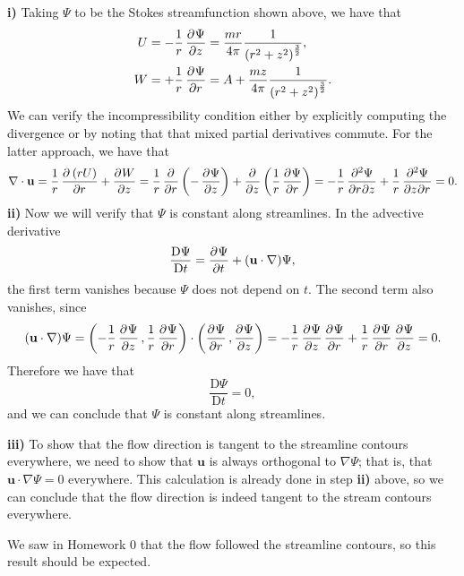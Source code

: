 \documentclass{article}
\def\*#1{\mathbf{#1}}
\newcommand{\dadvd}[2]{\dfrac{\text{D} #1}{\text{D} #2}} %
\begin{document}
\textbf{i)} Taking $\Psi$ to be the Stokes streamfunction shown above,
we have that
%
\begin{align*}
    U &= - \frac{1}{r} \dpd{\Psi}{z}
        = \frac{m r}{4 \pi} \frac{1}{\del{r^2 + z^2}^{\frac{3}{2}}}
        , \\
    W &= + \frac{1}{r} \dpd{\Psi}{r}
        = A + \frac{m z}{4 \pi} \frac{1}{\del{r^2 + z^2}^{\frac{3}{2}}}
        .
\end{align*}
%
We can verify the incompressibility condition either by explicitly
computing the divergence or by noting that that mixed partial
derivatives commute. For the latter approach, we have that
%
\begin{equation*}
    \nabla \cdot \*u
        = \frac{1}{r} \dpd{\del{r U}}{r} + \dpd{W}{z}
        = \frac{1}{r} \dpd{}{r} \del{- \dpd{\Psi}{z}}
            + \dpd{}{z} \del{\frac{1}{r} \dpd{\Psi}{r}}
        = - \frac{1}{r} \dmd{\Psi}{2}{r}{}{z}{}
            + \frac{1}{r} \dmd{\Psi}{2}{z}{}{r}{}
        = 0
        .
\end{equation*}
%
\textbf{ii)} Now we will verify that $\Psi$ is constant along
streamlines. In the advective derivative
%
\begin{equation*}
    \dadvd{\Psi}{t} = \dpd{\Psi}{t} + (\*u \cdot \nabla) \Psi
    ,
\end{equation*}
%
the first term vanishes because $\Psi$ does not depend on $t$. The
second term also vanishes, since
%
\begin{equation*}
    (\*u \cdot \nabla) \Psi
        = \del{- \frac{1}{r} \dpd{\Psi}{z}, \frac{1}{r} \dpd{\Psi}{r}}
            \cdot \del{\dpd{\Psi}{r}, \dpd{\Psi}{z}}
        = - \frac{1}{r} \dpd{\Psi}{z} \dpd{\Psi}{r}
            +\frac{1}{r} \dpd{\Psi}{r} \dpd{\Psi}{z}
        = 0
        .
\end{equation*}
%
Therefore we have that
%
\begin{equation*}
    \dadvd{\Psi}{t} = 0
    ,
\end{equation*}
%
and we can conclude that $\Psi$ is constant along streamlines.

\textbf{iii)} To show that the flow direction is tangent to the
streamline contours everywhere, we need to show that $\*u$ is always
orthogonal to $\nabla \Psi$; that is, that $\*u \cdot \nabla \Psi = 0$
everywhere. This calculation is already done in step \textbf{ii)} above,
so we can conclude that the flow direction is indeed tangent to the
stream contours everywhere.

We saw in Homework 0 that the flow followed the streamline contours, so
this result should be expected.
\end{document}

